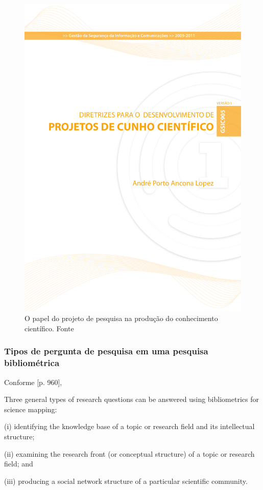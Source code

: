 \begin{figure}
    \centering
    \includegraphics[page=6,width=\textwidth,clip,trim={2.0cm 3cm 2.0cm 16.3cm}]{2-Analise-Exploratoria-Dados/aulas/2.2-Pesquisa-Bibliografica/GSIC905-V1TextoBase.pdf}
    \caption{O papel do projeto de pesquisa na produção do conhecimento científico. Fonte \cite[p.6]{lopez_diretrizes_2010}}
    \label{fig:ciclo_projeto}
\end{figure}


\subsubsection{Tipos de pergunta de pesquisa em uma pesquisa bibliométrica}

Conforme [p. 960]\cite{aria_bibliometrix_2017},

\begin{itquote}

    Three general types of research questions can be answered using bibliometrics for science mapping:
    
    (i) identifying the knowledge base of a topic or research field and its intellectual structure; 
    
    (ii) examining the research front (or conceptual structure) of a topic or research field; and 

    (iii) producing a social network structure of a particular scientific
community.

\end{itquote}

